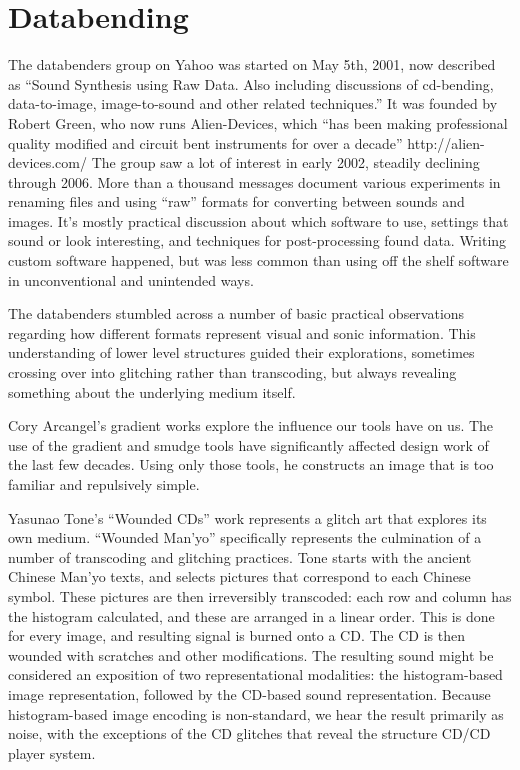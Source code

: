\documentclass{thesis}
\begin{document}
\section{Databending}
	\cite{indianropeburn_databenders_????}
	The databenders group on Yahoo was started on May 5th, 2001, now described as ``Sound Synthesis using Raw Data. Also including discussions of cd-bending, data-to-image, image-to-sound and other related techniques.'' It was founded by Robert Green, who now runs Alien-Devices, which ``has been making professional quality modified and circuit bent instruments for over a decade'' http://alien-devices.com/ The group saw a lot of interest in early 2002, steadily declining through 2006. More than a thousand messages document various experiments in renaming files and using ``raw'' formats for converting between sounds and images. It's mostly practical discussion about which software to use, settings that sound or look interesting, and techniques for post-processing found data. Writing custom software happened, but was less common than using off the shelf software in unconventional and unintended ways.
	
	The databenders stumbled across a number of basic practical observations regarding how different formats represent visual and sonic information. This understanding of lower level structures guided their explorations, sometimes crossing over into glitching rather than transcoding, but always revealing something about the underlying medium itself.
		
	\cite{cory_arcangel_photoshop_2009}
	Cory Arcangel's gradient works explore the influence our tools have on us. The use of the gradient and smudge tools have significantly affected design work of the last few decades. Using only those tools, he constructs an image that is too familiar and repulsively simple.
	
	\cite{media_art_net_media_2010}
	Yasunao Tone's ``Wounded CDs'' work represents a glitch art that explores its own medium. ``Wounded Man'yo'' specifically represents the culmination of a number of transcoding and glitching practices. Tone starts with the ancient Chinese Man'yo texts, and selects pictures that correspond to each Chinese symbol. These pictures are then irreversibly transcoded: each row and column has the histogram calculated, and these are arranged in a linear order. This is done for every image, and resulting signal is burned onto a CD. The CD is then wounded with scratches and other modifications. The resulting sound might be considered an exposition of two representational modalities: the histogram-based image representation, followed by the CD-based sound representation. Because histogram-based image encoding is non-standard, we hear the result primarily as noise, with the exceptions of the CD glitches that reveal the structure CD/CD player system.
	
\end{document}

